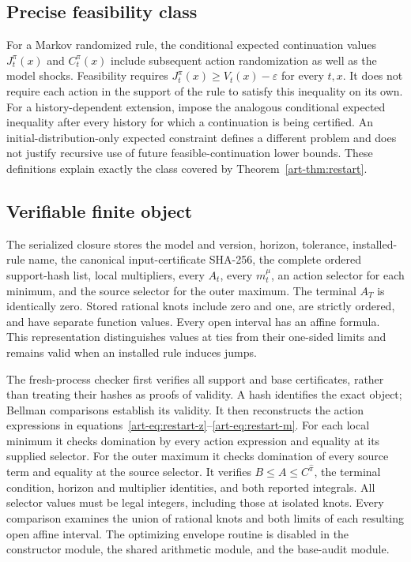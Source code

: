 \subsection{Precise feasibility class}
For a Markov randomized rule, the conditional expected continuation values $J_t^\pi(x)$ and $C_t^\pi(x)$ include subsequent action randomization as well as the model shocks. Feasibility requires $J_t^\pi(x)\ge V_t(x)-\varepsilon$ for every $t,x$. It does not require each action in the support of the rule to satisfy this inequality on its own. For a history-dependent extension, impose the analogous conditional expected inequality after every history for which a continuation is being certified. An initial-distribution-only expected constraint defines a different problem and does not justify recursive use of future feasible-continuation lower bounds. These definitions explain exactly the class covered by Theorem~\ref{art-thm:restart}.

\subsection{Verifiable finite object}
The serialized closure stores the model and version, horizon, tolerance, installed-rule name, the canonical input-certificate SHA-256, the complete ordered support-hash list, local multipliers, every $A_t$, every $m_t^\mu$, an action selector for each minimum, and the source selector for the outer maximum. The terminal $A_T$ is identically zero. Stored rational knots include zero and one, are strictly ordered, and have separate function values. Every open interval has an affine formula. This representation distinguishes values at ties from their one-sided limits and remains valid when an installed rule induces jumps.

The fresh-process checker first verifies all support and base certificates, rather than treating their hashes as proofs of validity. A hash identifies the exact object; Bellman comparisons establish its validity. It then reconstructs the action expressions in equations~\eqref{art-eq:restart-z}--\eqref{art-eq:restart-m}. For each local minimum it checks domination by every action expression and equality at its supplied selector. For the outer maximum it checks domination of every source term and equality at the source selector. It verifies $B\le A\le C^{\widehat\pi}$, the terminal condition, horizon and multiplier identities, and both reported integrals. All selector values must be legal integers, including those at isolated knots. Every comparison examines the union of rational knots and both limits of each resulting open affine interval. The optimizing envelope routine is disabled in the constructor module, the shared arithmetic module, and the base-audit module.

